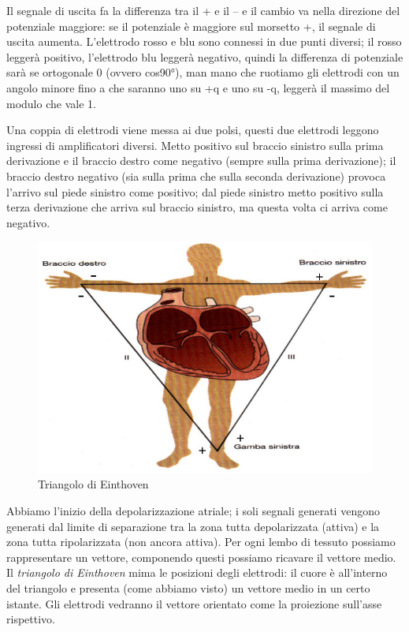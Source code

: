 \documentclass[a4paper,12pt]{article}
\begin{document}
Il segnale di uscita fa la differenza tra il + e il – e il cambio va nella direzione del potenziale maggiore: se il potenziale è maggiore sul morsetto +, il segnale di uscita aumenta. L'elettrodo rosso e blu sono connessi in due punti diversi; il rosso leggerà positivo, l'elettrodo blu leggerà negativo, quindi la differenza di potenziale sarà se ortogonale 0 (ovvero cos90°), man mano che ruotiamo gli elettrodi con un angolo minore fino a che saranno uno su +q e uno su -q, leggerà il massimo del modulo che vale 1.

Una coppia di elettrodi viene messa ai due polsi, questi due elettrodi leggono ingressi di amplificatori diversi. Metto positivo sul braccio sinistro sulla prima derivazione e il braccio destro come negativo (sempre sulla prima derivazione); il braccio destro negativo (sia sulla prima che sulla seconda derivazione) provoca l'arrivo sul piede sinistro come positivo; dal piede sinistro metto positivo sulla terza derivazione che arriva sul braccio sinistro, ma questa volta ci arriva come negativo. 
\begin{figure}[H]
\centering
\includegraphics[scale=0.4]{immagine/derivazione.jpg}
\caption{Triangolo di Einthoven}
\end{figure}
Abbiamo l'inizio della depolarizzazione atriale; i soli segnali generati vengono generati dal limite di separazione tra la zona tutta depolarizzata (attiva) e la zona tutta ripolarizzata (non ancora attiva). Per ogni lembo di tessuto possiamo rappresentare un vettore, componendo questi possiamo ricavare il vettore medio. 
Il \emph{triangolo di Einthoven} mima le posizioni degli elettrodi: il cuore è all'interno del triangolo e presenta (come abbiamo visto) un vettore medio in un certo istante. Gli elettrodi vedranno il vettore orientato come la proiezione sull'asse rispettivo.
\end{document}
